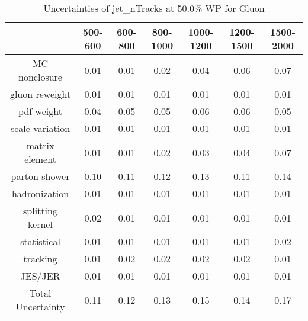 \begin{table}
\centering
\caption{Uncertainties of jet_nTracks at 50.0\% WP for Gluon}
\label{tab:syst_jet_nTracks_0.5_Gluon}
\begin{tabular}{ccccccc}
\toprule
{} &  500-600 &  600-800 &  800-1000 &  1000-1200 &  1200-1500 &  1500-2000 \\
\midrule
MC nonclosure     &     0.01 &     0.01 &      0.02 &       0.04 &       0.06 &       0.07 \\
gluon reweight    &     0.01 &     0.01 &      0.01 &       0.01 &       0.01 &       0.01 \\
pdf weight        &     0.04 &     0.05 &      0.05 &       0.06 &       0.06 &       0.05 \\
scale variation   &     0.01 &     0.01 &      0.01 &       0.01 &       0.01 &       0.01 \\
matrix element    &     0.01 &     0.01 &      0.02 &       0.03 &       0.04 &       0.07 \\
parton shower     &     0.10 &     0.11 &      0.12 &       0.13 &       0.11 &       0.14 \\
hadronization     &     0.01 &     0.01 &      0.01 &       0.01 &       0.01 &       0.01 \\
splitting kernel  &     0.02 &     0.01 &      0.01 &       0.01 &       0.01 &       0.01 \\
statistical       &     0.01 &     0.01 &      0.01 &       0.01 &       0.01 &       0.02 \\
tracking          &     0.01 &     0.02 &      0.02 &       0.02 &       0.02 &       0.01 \\
JES/JER           &     0.01 &     0.01 &      0.01 &       0.01 &       0.01 &       0.01 \\
Total Uncertainty &     0.11 &     0.12 &      0.13 &       0.15 &       0.14 &       0.17 \\
\bottomrule
\end{tabular}
\end{table}
